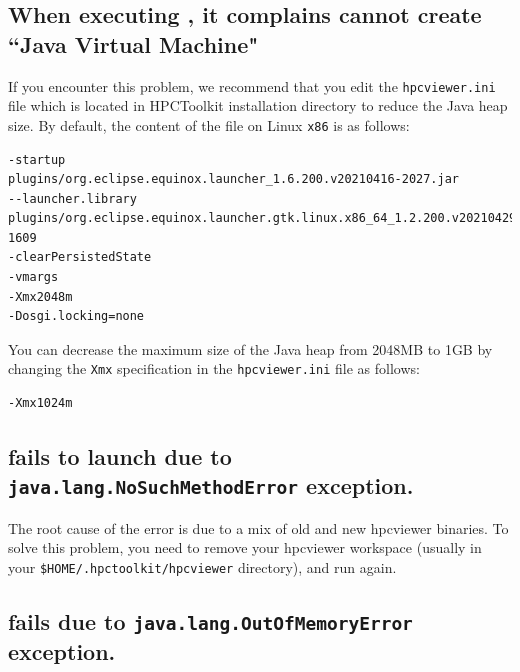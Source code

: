 \documentclass[11pt,twoside,letterpaper]{report}
\begin{document}

\subsection{When executing \hpcviewer, it complains cannot create ``Java Virtual Machine"}
If you encounter this problem, we recommend that you edit the
\texttt{hpcviewer.ini}
file which is located in HPCToolkit installation directory to reduce the
Java heap size.
By default, the content of the file on Linux \verb|x86| is as follows:
\begin{verbatim}
-startup
plugins/org.eclipse.equinox.launcher_1.6.200.v20210416-2027.jar
--launcher.library
plugins/org.eclipse.equinox.launcher.gtk.linux.x86_64_1.2.200.v20210429-1609
-clearPersistedState
-vmargs
-Xmx2048m
-Dosgi.locking=none
\end{verbatim}
You can decrease the maximum size of the Java heap from 2048MB to 1GB
 by changing the {\tt Xmx} specification in the \texttt{hpcviewer.ini} file as follows:
\begin{verbatim}
-Xmx1024m
\end{verbatim}



\subsection{\hpcviewer{} fails to launch due to {\tt java.lang.NoSuchMethodError} exception.}

The root cause of the error is due to a mix of old and new hpcviewer{} binaries.
To solve this problem, you need to remove your hpcviewer workspace (usually in your \texttt{\$HOME/.hpctoolkit/hpcviewer} directory), and run \hpcviewer{} again.


\subsection{\hpcviewer{} fails due to {\tt java.lang.OutOfMemoryError} exception.}
\end{document}
